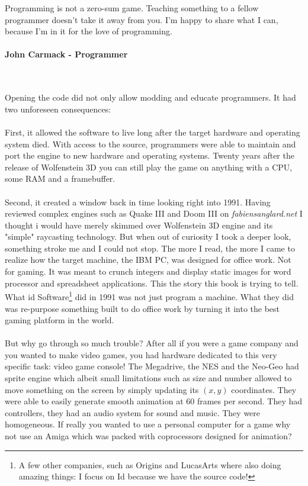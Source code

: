  \begin{fancyquotes}
   Programming is not a zero-sum game. Teaching something to a fellow programmer doesn't take it away from you. I'm happy to share what I can, because I'm in it for the love of programming.\\
   \\
\textbf{John Carmack - Programmer}
 \end{fancyquotes}\\
\\
Opening the code did not only allow modding and educate programmers. It had two unforeseen consequences:\\
\\
First, it allowed the software to live long after the target hardware and operating system died. With access to the source, programmers were able to maintain and port the engine to new hardware and operating systems. Twenty years after the release of Wolfenstein 3D you can still play the game on anything with a CPU, some RAM and a framebuffer. \\
\\
Second, it created a window back in time looking right into 1991. Having reviewed complex engines such as Quake III and Doom III on \emph{fabiensanglard.net} I thought i would have merely skimmed over Wolfenstein 3D engine and its "simple" raycasting technology. But when out of curiosity I took a deeper look, something stroke me and I could not stop. The more I read, the more I came to realize how the target machine, the IBM PC, was designed for office work. Not for gaming. It was meant to crunch integers and display static images for word processor and spreadsheet applications. This the story this book is trying to tell. What id Software\footnote{A few other companies, such as Origins and LucasArts where also doing amazing things: I focus on Id because we have the source code!} did in 1991 was not just program a machine. What they did was re-purpose something built to do office work by turning it into the best gaming platform in the world.\\
\\
But why go through so much trouble? After all if you were a game company and you wanted to make video games, you had hardware dedicated to this very specific task: video game console! The Megadrive, the NES and the Neo-Geo had sprite engine which albeit small limitations such as size and number allowed to move something on the screen by simply updating its $(x,y)$ coordinates. They were able to easily generate smooth animation at 60 frames per second. They had controllers, they had an audio system for sound and music. They were homogeneous. If really you wanted to use a personal computer for a game why not use an Amiga which was packed with coprocessors designed for animation?\\
